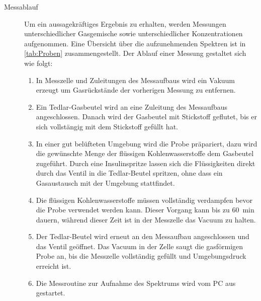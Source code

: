 \begin{description}
    \item[Messablauf] %
        Um ein aussagekräftiges Ergebnis zu erhalten, werden Messungen unterschiedlicher Gasgemische sowie unterschiedlicher Konzentrationen aufgenommen.
        Eine Übersicht über die aufzunehmenden Spektren ist in \cref{tab:Proben} zusammengestellt.
        Der Ablauf einer Messung gestaltet sich wie folgt:
        \begin{enumerate}%
            \item In Messzelle und Zuleitungen des Messaufbaus wird ein Vakuum erzeugt um Gasrückstände der vorherigen Messung zu entfernen.
            \item Ein Tedlar-Gasbeutel wird an eine Zuleitung des Messaufbaus angeschlossen.
                Danach wird der Gasbeutel mit Stickstoff geflutet, bis er sich vollstängig mit dem Stickstoff gefüllt hat.
            \item In einer gut belüfteten Umgebung wird die Probe präpariert, dazu wird die gewünschte Menge der flüssigen Kohlenwasserstoffe dem Gasbeutel zugeführt.
                Durch eine Insulinspritze lassen sich die Flüssigkeiten direkt durch das Ventil in die Tedlar-Beutel spritzen, ohne dass ein Gasaustausch mit der Umgebung stattfindet.
            \item Die flüssigen Kohlenwasserstoffe müssen vollständig verdampfen bevor die Probe verwendet werden kann. 
                Dieser Vorgang kann bis zu \SI{60}{min} dauern, während dieser Zeit ist in der Messzelle das Vacuum zu halten.
            \item Der Tedlar-Beutel wird erneut an den Messaufbau angeschlossen und das Ventil geöffnet.
                Das Vacuum in der Zelle saugt die gasförmigen Probe an, bis die Messzelle vollständig gefüllt und Umgebungsdruck erreicht ist.
            \item Die Messroutine zur Aufnahme des Spektrums wird vom PC aus gestartet.
        \end{enumerate}
        

\end{description}
